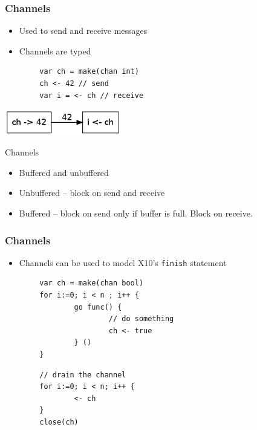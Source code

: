\documentclass{beamer}
\begin{document}
\begin{frame} [fragile]
\frametitle{Channels}
\begin{itemize}
\item Used to send and receive messages
\item Channels are typed
\end{itemize}
\begin{verbatim}
        var ch = make(chan int) 
        ch <- 42 // send 
        var i = <- ch // receive        
\end{verbatim}
\begin{center}
\includegraphics[width=2in]{channel.png}
\end{center}
\end{frame}

\begin{frame}{Channels}

\begin{itemize}
\item Buffered and unbuffered
\item Unbuffered -- block on send and receive
\item Buffered  -- block on send only if buffer is full. Block on receive.

\end{itemize}
\end{frame}

\begin{frame}[fragile]
\frametitle{Channels}
\begin{itemize}
\item Channels can be used to model X10's \verb=finish= statement
\end{itemize}
\begin{verbatim}
        var ch = make(chan bool)
        for i:=0; i < n ; i++ {
                go func() { 
                        // do something
                        ch <- true
                } ()
        }
\end{verbatim}
\pause
\begin{verbatim}
        // drain the channel
        for i:=0; i < n; i++ {
                <- ch
        }
        close(ch)
        
\end{verbatim}
\end{frame}
\end{document}
